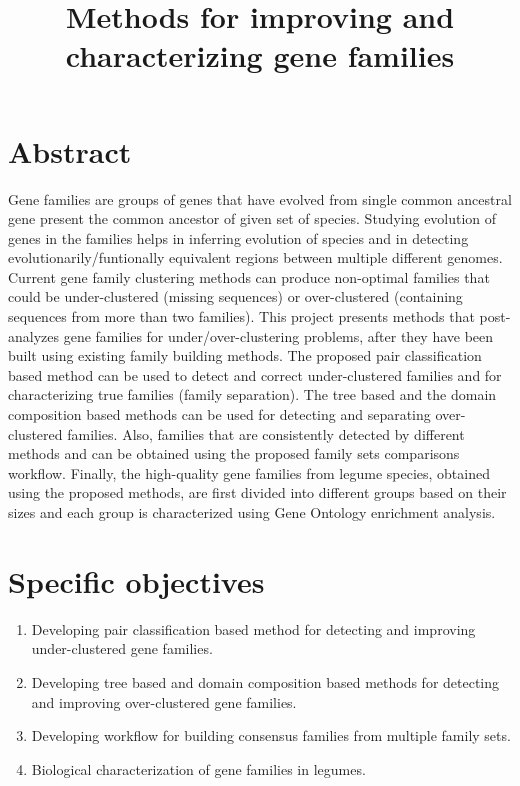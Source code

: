 \documentclass{article}
\date{}
\begin{document}
	\title{Methods for improving and characterizing gene families}
	\maketitle
	\section{Abstract}
	Gene families are groups of genes that have evolved from single common ancestral gene present the common ancestor of given set of species. Studying evolution of genes in the families helps in inferring evolution of species and in detecting evolutionarily/funtionally equivalent regions between multiple different genomes. Current gene family clustering methods can produce non-optimal families that could be under-clustered (missing sequences) or over-clustered (containing sequences from more than two families). This project presents methods that post-analyzes gene families for under/over-clustering problems, after they have been built using existing family building methods. The proposed pair classification based method can be used to detect and correct under-clustered families and for characterizing true families (family separation). The tree based and the domain composition based methods can be used for detecting and separating over-clustered families. Also, families that are consistently detected by different methods and can be obtained using the proposed family sets comparisons workflow. Finally, the high-quality gene families from legume species, obtained using the proposed methods, are first divided into different groups based on their sizes and each group is characterized using Gene Ontology enrichment analysis.  
	
	\section{Specific objectives}
		\begin{enumerate}
			\item Developing pair classification based method for detecting and improving under-clustered gene families.
			
			\item Developing tree based and domain composition based methods for detecting  and improving over-clustered gene families.
			
			\item Developing workflow for building consensus families from multiple family sets.
			
			\item Biological characterization of gene families in legumes.
		\end{enumerate}
	
\end{document}
